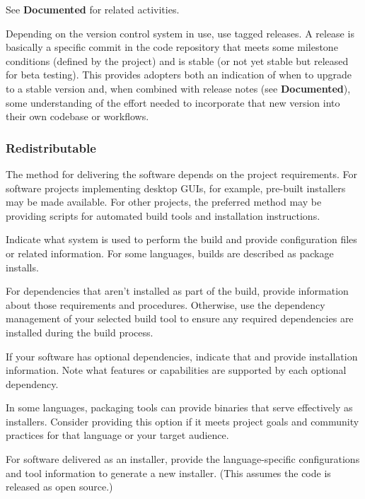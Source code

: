 \documentclass{article}
\newcounter{subsubsubsection}[subsubsection]
\begin{document}
See \textbf{Documented} for related activities.

Depending on the version control system in use, use tagged releases. A release is basically a specific commit in the code repository that meets some milestone conditions (defined by the project) and is stable (or not yet stable but released for beta testing). This provides adopters both an indication of when to upgrade to a stable version and, when combined with release notes (see \textbf{Documented}), some understanding of the effort needed to incorporate that new version into their own codebase or workflows.

\subsubsection{Redistributable}
The method for delivering the software depends on the project requirements. For software projects implementing desktop GUIs, for example, pre-built installers may be made available. For other projects, the preferred method may be providing scripts for automated build tools and installation instructions.

Indicate what system is used to perform the build and provide configuration files or related information. For some languages, builds are described as package installs.
 
For dependencies that aren’t installed as part of the build, provide information about those requirements and procedures. Otherwise, use the dependency management of your selected build tool to ensure any required dependencies are installed during the build process.
 
If your software has optional dependencies, indicate that and provide installation information. Note what features or capabilities are supported by each optional dependency. 
 
In some languages, packaging tools can provide binaries that serve effectively as installers. Consider providing this option if it meets project goals and community practices for that language or your target audience.

For software delivered as an installer, provide the language-specific configurations and tool information to generate a new installer. (This assumes the code is released as open source.)
\end{document}
